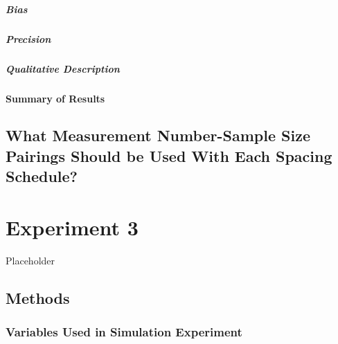 \documentclass[
12pt, %
twoside,
english]{guelphthesis}
\begin{document}
\hypertarget{bias-mid-ext-exp2}{%
\paragraph{Bias}\label{bias-mid-ext-exp2}}

\hypertarget{precision-mid-ext-exp2}{%
\paragraph{Precision}\label{precision-mid-ext-exp2}}

\hypertarget{qualitative-mid-ext-exp2}{%
\paragraph{Qualitative Description}\label{qualitative-mid-ext-exp2}}

\hypertarget{summary-of-results-7}{%
\subsubsection{Summary of Results}\label{summary-of-results-7}}

\hypertarget{what-measurement-number-sample-size-pairings-should-be-used-with-each-spacing-schedule}{%
\section{What Measurement Number-Sample Size Pairings Should be Used With Each Spacing Schedule?}\label{what-measurement-number-sample-size-pairings-should-be-used-with-each-spacing-schedule}}

\hypertarget{Exp3}{%
\chapter{Experiment 3}\label{Exp3}}

Placeholder

\hypertarget{methods-2}{%
\section{Methods}\label{methods-2}}

\hypertarget{variables-used-in-simulation-experiment-2}{%
\subsection{Variables Used in Simulation Experiment}\label{variables-used-in-simulation-experiment-2}}
\end{document}
